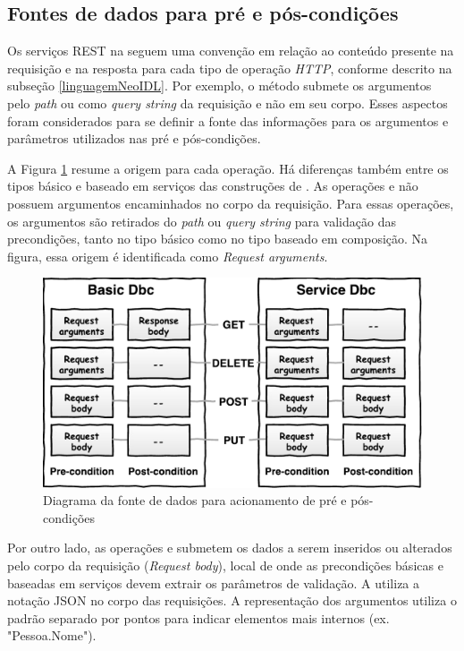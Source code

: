 \subsection{Fontes de dados para pré e pós-condições}
\label{FonteDadosDbc}

Os serviços REST na \neoidl{} seguem uma convenção em relação ao conteúdo
presente na requisição e na resposta para cada tipo de operação \emph{HTTP},
conforme descrito na subseção \ref{linguagemNeoIDL}. Por exemplo, o método 
submete os argumentos pelo \emph{path} ou como \textit{query string} da
requisição e não em seu corpo. Esses aspectos foram considerados para se definir
a fonte das informações para os argumentos e parâmetros utilizados nas pré e
pós-condições.

A Figura \ref{Fig:FonteDadosDbcNeoIDL} resume a origem para cada operação. Há
diferenças também entre os tipos básico e baseado em serviços das construções de
\designbycontract{}. As operações  e  não possuem
argumentos encaminhados no corpo da requisição. Para essas operações, os
argumentos são retirados do \emph{path} ou \emph{query string} para validação
das precondições, tanto no tipo básico como no tipo baseado em composição. Na
figura, essa origem é identificada como \textit{Request arguments}.

\begin{figure}[!htb]
\centering
\includegraphics[width=120mm,trim = 0mm 0mm 0mm
0mm,clip]{img/FonteDadosDbcNeoIDLIngles.pdf}
\caption{Diagrama da fonte de dados para acionamento de pré e pós-condições}
\label{Fig:FonteDadosDbcNeoIDL}
\end{figure}


Por outro lado, as operações  e  submetem os dados a
serem inseridos ou alterados pelo corpo da requisição (\textit{Request body}),
local de onde as precondições básicas e baseadas em serviços devem extrair os
parâmetros de validação.
A \neoidl{} utiliza a notação JSON\cite{JSon} no corpo das requisições. A
representação dos argumentos utiliza o padrão separado por pontos para indicar
elementos mais internos (ex. "Pessoa.Nome").

